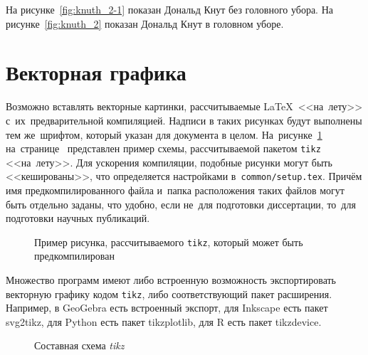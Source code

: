 На рисунке~\cref{fig:knuth_2-1} показан Дональд Кнут без головного убора.
На рисунке~\cref{fig:knuth_2}
показан Дональд Кнут в головном уборе.

\section{Векторная графика}\label{sec:ch5/vector}

Возможно вставлять векторные картинки, рассчитываемые \LaTeX\ <<на~лету>>
с~их~предварительной компиляцией. Надписи в таких рисунках будут выполнены
тем же~шрифтом, который указан для документа в целом.
На~рисунке~\cref{fig:tikz_example} на~странице~\pageref{fig:tikz_example}
представлен пример схемы, рассчитываемой пакетом \verb|tikz| <<на~лету>>.
Для ускорения компиляции, подобные рисунки могут быть <<кешированы>>, что
определяется настройками в~\verb|common/setup.tex|.
Причём имя предкомпилированного
файла и~папка расположения таких файлов могут быть отдельно заданы,
что удобно, если не~для подготовки диссертации,
то~для подготовки научных публикаций.
\begin{figure}[ht]
    \legend{}
    \caption[Пример \texttt{tikz} схемы]{Пример рисунка, рассчитываемого
        \texttt{tikz}, который может быть предкомпилирован}\label{fig:tikz_example}
\end{figure}

Множество программ имеют либо встроенную возможность экспортировать векторную
графику кодом \verb|tikz|, либо соответствующий пакет расширения.
Например, в GeoGebra есть встроенный экспорт,
для Inkscape есть пакет svg2tikz,
для Python есть пакет tikzplotlib,
для R есть пакет tikzdevice.

\begin{figure}[htbp]
    \caption{Составная схема \textit{tikz}}\label{fig:scheme-tikz}
\end{figure}

